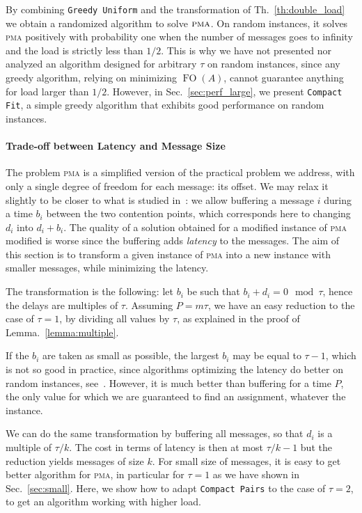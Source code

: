 \documentclass[a4paper,UKenglish,cleveref, autoref, thm-restate]{lipics-v2019}
\DeclareMathOperator{\Fo}{FO}
\newcommand\pma{\textsc{pma}\xspace}
\newcommand\compactpair{\texttt{Compact Pairs}\xspace}
\newcommand\greedyuniform{\texttt{Greedy Uniform}\xspace}
\newcommand\compactfit{\texttt{Compact Fit}\xspace}
\begin{document}
By combining \greedyuniform and the transformation of Th.~\ref{th:double_load} we obtain a randomized algorithm to solve $\pma$. On random instances, it solves \pma positively with probability one when the number of messages goes to infinity and the load is strictly less than $1/2$. This is why we have not presented nor analyzed an algorithm designed for arbitrary $\tau$ on random instances, since any greedy algorithm, relying on minimizing $\Fo(A)$, cannot guarantee anything for load larger than $1/2$. However, in Sec.~\ref{sec:perf_large}, we present \compactfit, a simple greedy algorithm that exhibits good performance on random instances.

\paragraph*{Trade-off between Latency and Message Size}

The problem \pma is a simplified version of the practical problem we address, with only a single degree of freedom for each message: its offset. We may relax it slightly to be closer to what is studied in~\cite{barth2018deterministic}: we allow buffering a message $i$ during a time $b_i$ between the two contention points, which corresponds here to changing $d_i$ into $d_i + b_i$. The quality of a solution obtained for a modified instance of \pma modified is worse since the buffering adds \emph{latency} to the messages. The aim of this section is to transform a given instance of 
\pma into a new instance with smaller messages, while minimizing the latency.

The transformation is the following: let $b_i$ be such that 
 $b_i + d_i = 0 \mod \tau$, hence the delays are multiples of $\tau$. Assuming $P = m\tau$, we have an easy reduction to the case of $\tau = 1$, by dividing all values by $\tau$, as explained in the proof of Lemma.~\ref{lemma:multiple}. 

If the $b_i$ are taken as small as possible, the largest $b_i$ may be equal to $\tau -1$, which is not so good in practice, since algorithms optimizing the latency do better on random instances, see~\cite{barth2018deterministic}. However, it is much better than buffering for a time $P$, the only value for which we are guaranteed to find an assignment, whatever the instance. 


We can do the same transformation by buffering all messages, so that $d_i$ is a multiple of $\tau / k$. The cost in terms of latency is then at most $\tau / k - 1$ but the reduction yields messages of size $k$. For small size of messages, it is easy to get better algorithm for \pma, in particular for $\tau = 1$ as we have shown in Sec.~\ref{sec:small}. Here, we show how to adapt \compactpair to the case of $\tau = 2$, to get an algorithm working with higher load.
\end{document}

